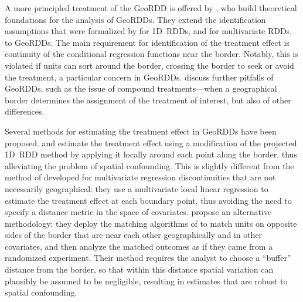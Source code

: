 \documentclass[12pt]{article}
\begin{document}
A more principled treatment of the GeoRDD is offered by \cite{keele_titiunik_2015}, who build theoretical foundations for the analysis of GeoRDDs.
They extend the identification assumptions that were formalized by \cite{hahn2001identification} for 1D~RDDs, and \cite{imbens2011regression} for multivariate RDDs, to GeoRDDs.
The main requirement for identification of the treatment effect is continuity of the conditional regression functions near the border.
Notably, this is violated if units can sort around the border, crossing the border to seek or avoid the treatment, a particular concern in GeoRDDs.
\cite{keele_titiunik_2015} discuss further pitfalls of GeoRDDs, such as the issue of compound treatments---when a geographical border determines the assignment of the treatment of interest, but also of other differences.

Several methods for estimating the treatment effect in GeoRDDs have been proposed.
\cite{keele_titiunik_2015} and \cite{keeleoverview} estimate the treatment effect using a modification of the projected 1D~RDD method by applying it locally around each point along the border, thus alleviating the problem of spatial confounding.
This is slightly different from the method of \cite{imbens2011regression} developed for multivariate regression discontinuities that are not necessarily geographical: they use a multivariate local linear regression to estimate the treatment effect at each boundary point, thus avoiding the need to specify a distance metric in the space of covariates.
\cite{keele2015enhancing} propose an alternative methodology: they deploy the matching algorithms of \cite{zubizarreta2012using} to match units on opposite sides of the border that are near each other geographically and in other covariates, and then analyze the matched outcomes as if they came from a randomized experiment.
Their method requires the analyst to choose a ``buffer'' distance from the border, so that within this distance spatial variation can plausibly be assumed to be negligible, resulting in estimates that are robust to spatial confounding.

\label{sec:framework}
\end{document}
